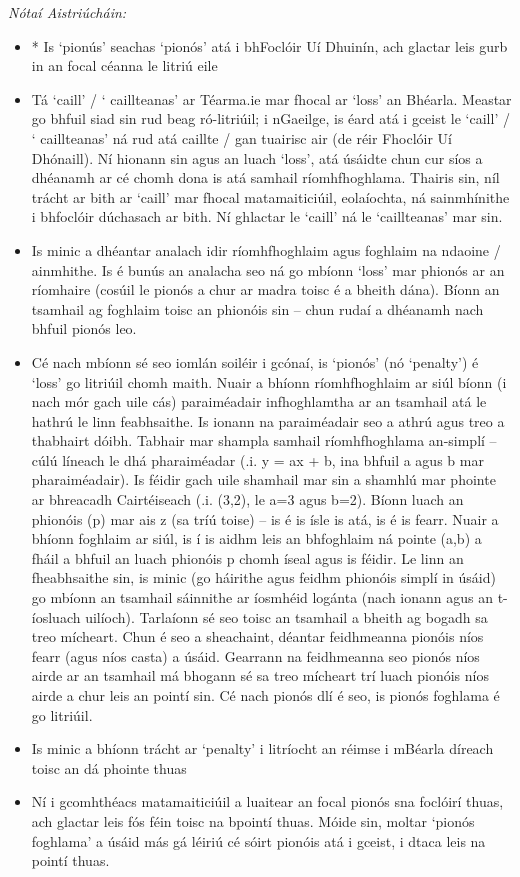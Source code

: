 \documentclass{article}
\begin{document}
 \noindent \textit{Nótaí Aistriúcháin:}
\begin{itemize}
	\item * Is `pionús' seachas `pionós' atá i bhFoclóir Uí Dhuinín, ach glactar leis gurb in an focal céanna le litriú eile
	\item Tá `caill' / ` caillteanas' ar Téarma.ie mar fhocal ar `loss' an Bhéarla. Meastar go bhfuil siad sin rud beag ró-litriúil; i nGaeilge, is éard atá i gceist le `caill' / ` caillteanas' ná rud atá caillte / gan tuairisc air (de réir Fhoclóir Uí Dhónaill). Ní hionann sin agus an luach `loss', atá úsáidte chun cur síos a dhéanamh ar cé chomh dona is atá samhail ríomhfhoghlama. Thairis sin, níl trácht ar bith ar `caill' mar fhocal matamaiticiúil, eolaíochta, ná sainmhínithe i bhfoclóir dúchasach ar bith. Ní ghlactar le `caill' ná le `caillteanas' mar sin.
	\item Is minic a dhéantar analach idir ríomhfhoghlaim agus foghlaim na ndaoine / ainmhithe. Is é bunús an analacha seo ná go mbíonn `loss' mar phionós ar an ríomhaire (cosúil le pionós a chur ar madra toisc é a bheith dána). Bíonn an tsamhail ag foghlaim toisc an phionóis sin -- chun rudaí a dhéanamh nach bhfuil pionós leo.
	\item Cé nach mbíonn sé seo iomlán soiléir i gcónaí, is `pionós' (nó `penalty') é `loss' go litriúil chomh maith. Nuair a bhíonn ríomhfhoghlaim ar siúl bíonn (i nach mór gach uile cás) paraiméadair infhoghlamtha ar an tsamhail atá le hathrú le linn feabhsaithe. Is ionann na paraiméadair seo a athrú agus treo a thabhairt dóibh. Tabhair mar shampla samhail ríomhfhoghlama an-simplí -- cúlú líneach le dhá pharaiméadar (.i. y = ax + b, ina bhfuil a agus b mar pharaiméadair). Is féidir gach uile shamhail mar sin a shamhlú mar phointe ar bhreacadh Cairtéiseach (.i. (3,2), le a=3 agus b=2). Bíonn luach an phionóis (p) mar ais z (sa tríú toise) -- is é is ísle is atá, is é is fearr. Nuair a bhíonn foghlaim ar siúl, is í is aidhm leis an bhfoghlaim ná pointe (a,b) a fháil a bhfuil an luach phionóis p chomh íseal agus is féidir. Le linn an fheabhsaithe sin, is minic (go háirithe agus feidhm phionóis simplí in úsáid) go mbíonn an tsamhail sáinnithe ar íosmhéid logánta (nach ionann agus an t-íosluach uilíoch). Tarlaíonn sé seo toisc an tsamhail a bheith ag bogadh sa treo mícheart. Chun é seo a sheachaint, déantar feidhmeanna pionóis níos fearr (agus níos casta) a úsáid. Gearrann na feidhmeanna seo pionós níos airde ar an tsamhail má bhogann sé sa treo mícheart trí luach pionóis níos airde a chur leis an pointí sin. Cé nach pionós dlí é seo, is pionós foghlama é go litriúil.
	\item Is minic a bhíonn trácht ar `penalty' i litríocht an réimse i mBéarla díreach toisc an dá phointe thuas
	\item Ní i gcomhthéacs matamaiticiúil a luaitear an focal pionós sna foclóirí thuas, ach glactar leis fós féin toisc na bpointí thuas. Móide sin, moltar `pionós foghlama' a úsáid más gá léiriú cé sóirt pionóis atá i gceist, i dtaca leis na pointí thuas.
\end{itemize}
\end{document}
